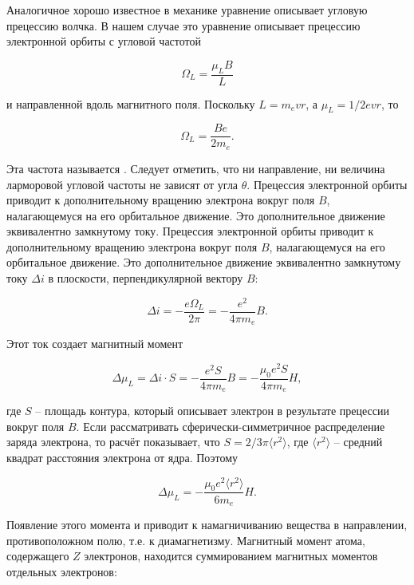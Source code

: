 Аналогичное хорошо известное в механике уравнение описывает угловую прецессию волчка. В нашем случае это уравнение описывает прецессию электронной орбиты с угловой частотой

\begin{equation*}
	\Omega_L = \frac{\mu_L B}{L}
\end{equation*}

и направленной вдоль магнитного поля. Поскольку $L = m_e vr$, а  $\mu_L = 1/2evr$, то

\begin{equation*}
	\Omega_L = \frac{Be}{2m_e}.
\end{equation*}

Эта частота называется . Следует отметить, что ни направление, ни величина ларморовой угловой частоты не зависят от угла $\theta$.
Прецессия электронной орбиты приводит к дополнительному вращению электрона вокруг поля $B$, налагающемуся на его орбитальное движение.  Это дополнительное движение эквивалентно замкнутому току. Прецессия электронной орбиты приводит к дополнительному вращению электрона вокруг поля $B$, налагающемуся на его орбитальное движение. Это дополнительное движение эквивалентно замкнутому току $\Delta i$ в плоскости, перпендикулярной вектору $B$:

\begin{equation*}
	\Delta i = - \frac{e\Omega_L}{2\pi} = - \frac{e^2}{4\pi m_e}B.
\end{equation*}

Этот ток создает магнитный момент

\begin{equation*}
	\Delta\mu_L = \Delta i \cdot S = - \frac{e^2 S}{4\pi m_e}B = - \frac{\mu_0 e^2 S}{4\pi m_e}H,
\end{equation*}

где $S$ -- площадь контура, который описывает электрон в результате прецессии вокруг поля $B$. Если рассматривать сферически-симметричное распределение заряда электрона, то расчёт показывает, что $S = 2/3\pi\langle r^2 \rangle$, где $\langle r^2 \rangle$  -- средний квадрат расстояния электрона от ядра. Поэтому

\begin{equation*}
	\Delta\mu_L = - \frac{\mu_0 e^2 \langle r^2 \rangle}{6m_e}H.
\end{equation*}

Появление этого момента и приводит к намагничиванию вещества в направлении, противоположном полю, т.е. к диамагнетизму. Магнитный момент атома, содержащего $Z$ электронов, находится суммированием магнитных моментов отдельных электронов:

